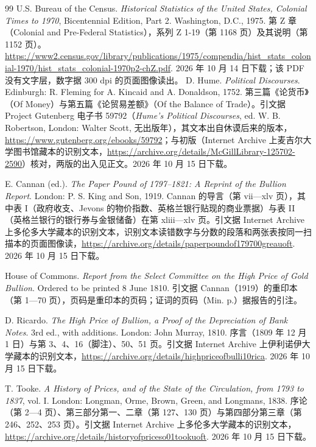 \begin{thebibliography}{99}
 U.S. Bureau of the Census. \emph{Historical Statistics of the United States, Colonial Times to 1970}, Bicentennial Edition, Part 2. Washington, D.C., 1975. 第 Z 章（Colonial and Pre-Federal Statistics），系列 Z 1-19（第 1168 页）及其说明（第 1152 页）。\url{https://www2.census.gov/library/publications/1975/compendia/hist_stats_colonial-1970/hist_stats_colonial-1970p2-chZ.pdf}. 2026 年 10 月 14 日下载；该 PDF 没有文字层，数字据 300 dpi 的页面图像读出。
 D. Hume. \emph{Political Discourses}. Edinburgh: R. Fleming for A. Kincaid and A. Donaldson, 1752. 第三篇《论货币》（Of Money）与第五篇《论贸易差额》（Of the Balance of Trade）。引文据 Project Gutenberg 电子书 59792（\emph{Hume's Political Discourses}, ed. W. B. Robertson, London: Walter Scott, 无出版年），其文本出自休谟后来的版本，\url{https://www.gutenberg.org/ebooks/59792}；与初版（Internet Archive 上麦吉尔大学图书馆藏本的识别文本，\url{https://archive.org/details/McGillLibrary-125702-2590}）核对，两版的出入见正文。2026 年 10 月 15 日下载。

 E. Cannan (ed.). \emph{The Paper Pound of 1797--1821: A Reprint of the Bullion Report}. London: P. S. King and Son, 1919. Cannan 的导言（第 vii—xlv 页），其中表 I（政府收支、Jevons 的物价指数、英格兰银行贴现的商业票据）与表 II（英格兰银行的银行券与金银储备）在第 xliii—xlv 页。引文据 Internet Archive 上多伦多大学藏本的识别文本，识别文本读错数字与分数的段落和两张表按同一扫描本的页面图像读，\url{https://archive.org/details/paperpoundof179700greauoft}. 2026 年 10 月 15 日下载。

 House of Commons. \emph{Report from the Select Committee on the High Price of Gold Bullion}. Ordered to be printed 8 June 1810. 引文据 Cannan（1919）的重印本（第 1—70 页），页码是重印本的页码；证词的页码（Min. p.）据报告的引注。

 D. Ricardo. \emph{The High Price of Bullion, a Proof of the Depreciation of Bank Notes}. 3rd ed., with additions. London: John Murray, 1810. 序言（1809 年 12 月 1 日）与第 3、4、16（脚注）、50、51 页。引文据 Internet Archive 上伊利诺伊大学藏本的识别文本，\url{https://archive.org/details/highpriceofbulli10rica}. 2026 年 10 月 15 日下载。

 T. Tooke. \emph{A History of Prices, and of the State of the Circulation, from 1793 to 1837}, vol. I. London: Longman, Orme, Brown, Green, and Longmans, 1838. 序论（第 2—4 页）、第三部分第一、二章（第 127、130 页）与第四部分第三章（第 246、252、253 页）。引文据 Internet Archive 上多伦多大学藏本的识别文本，\url{https://archive.org/details/historyofpriceso01tookuoft}. 2026 年 10 月 15 日下载。


\end{thebibliography}
